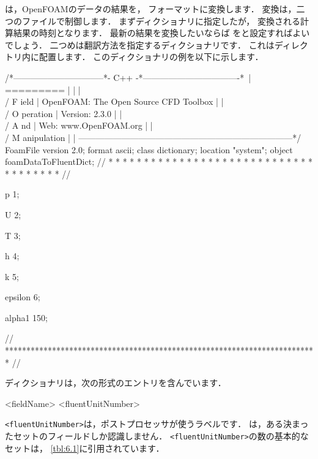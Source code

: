 は，OpenFOAMのデータの結果を，
フォーマットに変換します．
変換は，二つのファイルで制御します．
まずディクショナリに指定したが，
変換される計算結果の時刻となります．
最新の結果を変換したいならば
をと設定すればよいでしょう．
二つめは翻訳方法を指定するディクショナリです．
これはディレクトリ内に配置します．
このディクショナリの例を以下に示します．
\begin{OFverbatim}
/*--------------------------------*- C++ -*----------------------------------*\
| =========                 |                                                 |
| \\      /  F ield         | OpenFOAM: The Open Source CFD Toolbox           |
|  \\    /   O peration     | Version:  2.3.0                                 |
|   \\  /    A nd           | Web:      www.OpenFOAM.org                      |
|    \\/     M anipulation  |                                                 |
\*---------------------------------------------------------------------------*/
FoamFile
{
    version    2.0;
    format     ascii;
    class      dictionary;
    location   "system";
    object     foamDataToFluentDict;
}
// * * * * * * * * * * * * * * * * * * * * * * * * * * * * * * * * * * * * * //

p               1;

U               2;

T               3;

h               4;

k               5;

epsilon         6;

alpha1        150;


// ************************************************************************* //
\end{OFverbatim}
ディクショナリは，次の形式のエントリを含んでいます．
\begin{OFverbatim}[file]
<fieldName> <fluentUnitNumber>
\end{OFverbatim}
\verb|<fluentUnitNumber>|は，ポストプロセッサが使うラベルです．
\OFthirdparty{Fluent}は，ある決まったセットのフィールドしか認識しません．
\verb|<fluentUnitNumber>|の数の基本的なセットは，
\autoref{tbl:6.1}に引用されています．


